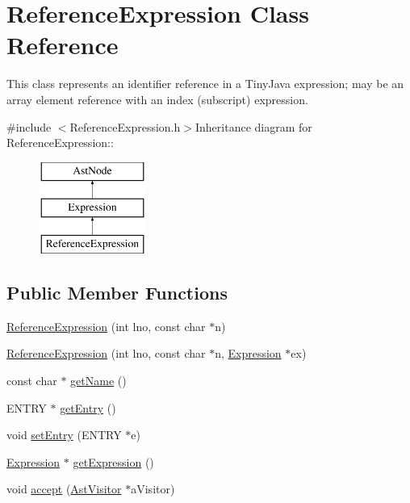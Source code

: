 \hypertarget{classReferenceExpression}{
\section{ReferenceExpression Class Reference}
\label{classReferenceExpression}
}


This class represents an identifier reference in a TinyJava expression; may be an array element reference with an index (subscript) expression.  


{\ttfamily \#include $<$ReferenceExpression.h$>$}Inheritance diagram for ReferenceExpression::\begin{figure}[H]
\begin{center}
\leavevmode
\includegraphics[height=3cm]{classReferenceExpression}
\end{center}
\end{figure}
\subsection*{Public Member Functions}
\begin{DoxyCompactItemize}
\item 
\hyperlink{classReferenceExpression_a7f614ef621f7336070a5a0f495475cce}{ReferenceExpression} (int lno, const char $\ast$n)
\item 
\hyperlink{classReferenceExpression_a374d0940a132e2c36b96f502354822af}{ReferenceExpression} (int lno, const char $\ast$n, \hyperlink{classExpression}{Expression} $\ast$ex)
\item 
const char $\ast$ \hyperlink{classReferenceExpression_a5a5123067be08b29efb72db0a3c59ec0}{getName} ()
\item 
ENTRY $\ast$ \hyperlink{classReferenceExpression_aaa972751c0253013518547cf6efaa513}{getEntry} ()
\item 
void \hyperlink{classReferenceExpression_a764220182810e4b7d0ec4b5f294d08f8}{setEntry} (ENTRY $\ast$e)
\item 
\hyperlink{classExpression}{Expression} $\ast$ \hyperlink{classReferenceExpression_a88b28a401551edd1cd4462df16ce8a51}{getExpression} ()
\item 
void \hyperlink{classReferenceExpression_a5235ddeb368f790fd69b73dc1fe5a80e}{accept} (\hyperlink{classAstVisitor}{AstVisitor} $\ast$aVisitor)
\end{DoxyCompactItemize}



